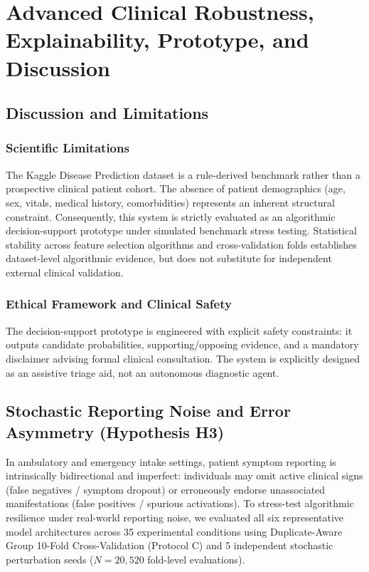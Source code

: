 \chapter{Advanced Clinical Robustness, Explainability, Prototype, and Discussion}
\label{chap:conclusion}

\section{Discussion and Limitations}
\label{sec:discussion}

\subsection{Scientific Limitations}
\label{subsec:scientific_limitations}
The Kaggle Disease Prediction dataset is a rule-derived benchmark rather than a prospective clinical patient cohort. The absence of patient demographics (age, sex, vitals, medical history, comorbidities) represents an inherent structural constraint. Consequently, this system is strictly evaluated as an algorithmic decision-support prototype under simulated benchmark stress testing. Statistical stability across feature selection algorithms and cross-validation folds establishes dataset-level algorithmic evidence, but does not substitute for independent external clinical validation.

\subsection{Ethical Framework and Clinical Safety}
\label{subsec:ethical_framework}
The decision-support prototype is engineered with explicit safety constraints: it outputs candidate probabilities, supporting/opposing evidence, and a mandatory disclaimer advising formal clinical consultation. The system is explicitly designed as an assistive triage aid, not an autonomous diagnostic agent.

\section{Stochastic Reporting Noise and Error Asymmetry (Hypothesis H3)}
\label{sec:reporting_noise}

In ambulatory and emergency intake settings, patient symptom reporting is intrinsically bidirectional and imperfect: individuals may omit active clinical signs (false negatives / symptom dropout) or erroneously endorse unassociated manifestations (false positives / spurious activations). To stress-test algorithmic resilience under real-world reporting noise, we evaluated all six representative model architectures across 35 experimental conditions using Duplicate-Aware Group 10-Fold Cross-Validation (Protocol C) and 5 independent stochastic perturbation seeds ($N = 20,520$ fold-level evaluations).

